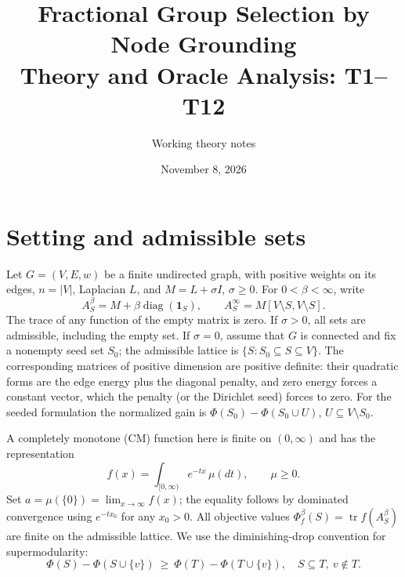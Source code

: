 \documentclass[11pt]{article}
\title{Fractional Group Selection by Node Grounding\\Theory and Oracle Analysis: T1--T12}
\author{Working theory notes}
\date{November 8, 2026}
\DeclareMathOperator{\tr}{tr}
\DeclareMathOperator{\diag}{diag}
\newcommand{\ind}{\mathbf 1}
\begin{document}
\maketitle

\section{Setting and admissible sets}
Let $G=(V,E,w)$ be a finite undirected graph, with positive weights on
its edges, $n=|V|$, Laplacian $L$, and $M=L+\sigma I$, $\sigma\geq0$.
For $0<\beta<\infty$, write
\[
 A_S^{\beta}=M+\beta\diag(\ind_S),\qquad
 A_S^{\infty}=M[V\setminus S,V\setminus S].
\]
The trace of any function of the empty matrix is zero. If $\sigma>0$,
all sets are admissible, including the empty set. If $\sigma=0$, assume
that $G$ is connected and fix a nonempty seed set $S_0$; the admissible
lattice is $\{S:S_0\subseteq S\subseteq V\}$. The corresponding matrices
of positive dimension are positive definite: their quadratic forms are
the edge energy plus the diagonal penalty, and zero energy forces a
constant vector, which the penalty (or the Dirichlet seed) forces to zero.
For the seeded formulation the normalized gain is
$\Phi(S_0)-\Phi(S_0\cup U)$, $U\subseteq V\setminus S_0$.

A completely monotone (CM) function here is finite on $(0,\infty)$ and has
the representation
\begin{equation}\label{eq:cm}
 f(x)=\int_{[0,\infty)}e^{-tx}\,\mu(dt),\qquad \mu\geq0.
\end{equation}
Set $a=\mu(\{0\})=\lim_{x\to\infty}f(x)$; the equality follows by dominated
convergence using $e^{-t x_0}$ for any $x_0>0$.
All objective values $\Phi_f^\beta(S)=\tr f(A_S^\beta)$ are finite on the
admissible lattice. We use the diminishing-drop convention for
supermodularity:
\begin{equation}\label{eq:super}
 \Phi(S)-\Phi(S\cup\{v\})\ \geq\
 \Phi(T)-\Phi(T\cup\{v\}),\quad S\subseteq T,\ v\notin T.
\end{equation}
\end{document}
